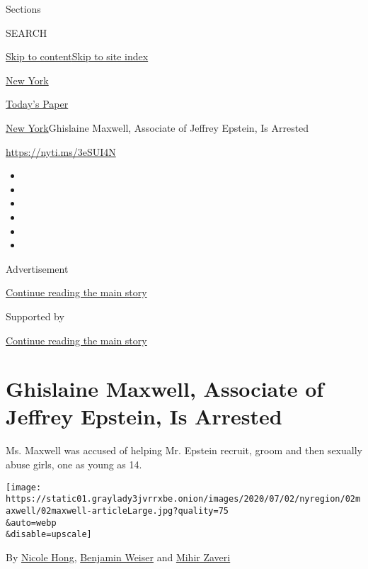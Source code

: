 Sections

SEARCH

\protect\hyperlink{site-content}{Skip to
content}\protect\hyperlink{site-index}{Skip to site index}

\href{https://www.nytimes3xbfgragh.onion/section/nyregion}{New York}

\href{https://myaccount.nytimes3xbfgragh.onion/auth/login?response_type=cookie\&client_id=vi}{}

\href{https://www.nytimes3xbfgragh.onion/section/todayspaper}{Today's
Paper}

\href{/section/nyregion}{New York}\textbar{}Ghislaine Maxwell, Associate
of Jeffrey Epstein, Is Arrested

\url{https://nyti.ms/3eSUI4N}

\begin{itemize}
\item
\item
\item
\item
\item
\item
\end{itemize}

Advertisement

\protect\hyperlink{after-top}{Continue reading the main story}

Supported by

\protect\hyperlink{after-sponsor}{Continue reading the main story}

\hypertarget{ghislaine-maxwell-associate-of-jeffrey-epstein-is-arrested}{%
\section{Ghislaine Maxwell, Associate of Jeffrey Epstein, Is
Arrested}\label{ghislaine-maxwell-associate-of-jeffrey-epstein-is-arrested}}

Ms. Maxwell was accused of helping Mr. Epstein recruit, groom and then
sexually abuse girls, one as young as 14.

\texttt{[image: https://static01.graylady3jvrrxbe.onion/images/2020/07/02/nyregion/02maxwell/02maxwell-articleLarge.jpg?quality=75\\\&auto=webp\\\&disable=upscale]}

By \href{https://www.nytimes3xbfgragh.onion/by/nicole-hong}{Nicole
Hong},
\href{https://www.nytimes3xbfgragh.onion/by/benjamin-weiser}{Benjamin
Weiser} and
\href{https://www.nytimes3xbfgragh.onion/by/mihir-zaveri}{Mihir Zaveri}

